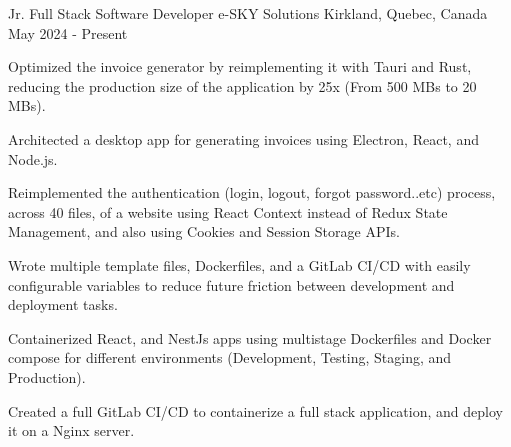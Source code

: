 

\begin{cventries}

  \cventry
   {Jr. Full Stack Software Developer} %
    {e-SKY Solutions} %
    {Kirkland, Quebec, Canada} %
    {May 2024 - Present} %
    {
      \begin{cvitems} %
        \item {Optimized the invoice generator by reimplementing it with Tauri and Rust, reducing the production size of the application by 25x (From 500 MBs to 20 MBs).}
        \item {Architected a desktop app for generating invoices using Electron, React, and Node.js.}
        \item {Reimplemented the authentication (login, logout, forgot password..etc) process, across 40 files, of a website using React Context instead of Redux State Management, and also using Cookies and Session Storage APIs.}
        \item {Wrote multiple template files, Dockerfiles, and a GitLab CI/CD with easily configurable variables to reduce future friction between development and deployment tasks.}
        \item {Containerized React, and NestJs apps using multistage Dockerfiles and Docker compose for different environments (Development, Testing, Staging, and Production).}
        \item{Created a full GitLab CI/CD to containerize a full stack application, and deploy it on a Nginx server.}
      \end{cvitems}
    }
    


\end{cventries}
